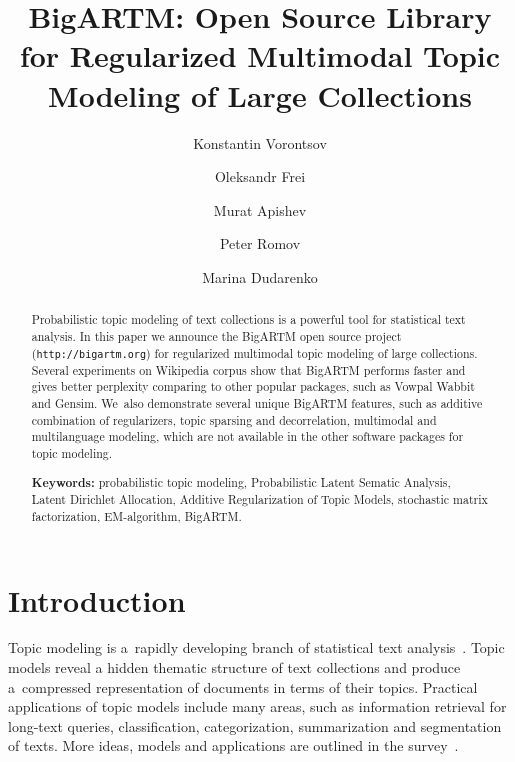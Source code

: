 \documentclass[russian]{llncs}
\begin{document}
\title{
    BigARTM: Open Source Library for
    Regularized Multimodal %
    Topic Modeling of Large Collections
}
\author{
    Konstantin Vorontsov
    \and
    Oleksandr Frei
    \and
    Murat Apishev
    \and
    Peter Romov
    \and
    Marina Dudarenko
}

\maketitle

\begin{abstract}
Probabilistic topic modeling of text collections is a powerful tool for statistical text analysis.
In this paper we announce the \mbox{BigARTM} open source project (\texttt{http://bigartm.org})
for regularized multimodal topic modeling of large collections.
Several experiments on Wikipedia corpus show that BigARTM performs faster and gives better perplexity
comparing to other popular packages, such as Vowpal Wabbit and Gensim.
We~also demonstrate several unique BigARTM features, such as
additive combination of regularizers,
topic sparsing and decorrelation,
multimodal and multilanguage modeling,
which are not available in the other software packages for topic modeling.

\vspace{1em}
\textbf{Keywords:}
    probabilistic topic modeling,
    Probabilistic Latent Sematic Analysis,
    Latent Dirichlet Allocation,
    Additive Regularization of Topic Models,
    stochastic matrix factorization,
    EM-algorithm,
    BigARTM.
\end{abstract}

\section{Introduction}

Topic modeling is a~rapidly developing branch of statistical text analysis~\cite{blei12ptm}.
Topic models reveal a hidden thematic structure of text collections
and produce a~compressed representation of documents in terms of their topics.
Practical applications of topic models include many areas, such as
information retrieval for long-text queries,
classification, categorization, summarization and segmentation of texts.
More ideas, models and applications are outlined in the survey~\cite{daud10knowledge}.
\end{document}
